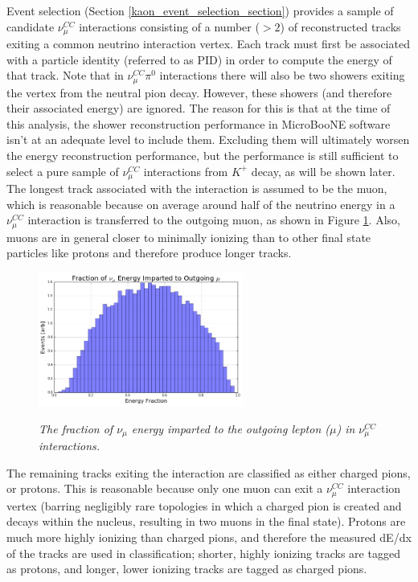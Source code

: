 Event selection (Section \ref{kaon_event_selection_section}) provides a sample of candidate $\nu_\mu^{CC}$ interactions consisting of a number ($>2$) of reconstructed tracks exiting a common neutrino interaction vertex. Each track must first be associated with a particle identity (referred to as PID) in order to compute the energy of that track. Note that in $\nu_\mu^{CC}\pi^0$ interactions there will also be two showers exiting the vertex from the neutral pion decay. However, these showers (and therefore their associated energy) are ignored. The reason for this is that at the time of this analysis, the shower reconstruction performance in MicroBooNE software isn't at an adequate level to include them. Excluding them will ultimately worsen the energy reconstruction performance, but the performance is still sufficient to select a pure sample of $\nu_\mu^{CC}$ interactions from $K^+$ decay, as will be shown later.\\

The longest track associated with the interaction is assumed to be the muon, which is reasonable because on average around half of the neutrino energy in a $\nu_\mu^{CC}$ interaction is transferred to the outgoing muon, as shown in Figure \ref{numuCC_energyfraction_tomuon_fig}. Also, muons are in general closer to minimally ionizing than to other final state particles like protons and therefore produce longer tracks.\\

\begin{figure}[ht!]
\centering
	\includegraphics[width=0.6\textwidth]{Figures/numuCC_energyfraction_tomuon.png} \\
\caption{\textit{The fraction of $\nu_\mu$ energy imparted to the outgoing lepton ($\mu$) in $\nu_\mu^{CC}$ interactions.}}\label{numuCC_energyfraction_tomuon_fig}
\end{figure}

The remaining tracks exiting the interaction are classified as either charged pions, or protons. This is reasonable because only one muon can exit a $\nu_\mu^{CC}$ interaction vertex (barring negligibly rare topologies in which a charged pion is created and decays within the nucleus, resulting in two muons in the final state). Protons are much more highly ionizing than charged pions, and therefore the measured dE/dx of the tracks are used in classification; shorter, highly ionizing tracks are tagged as protons, and longer, lower ionizing tracks are tagged as charged pions.\\

